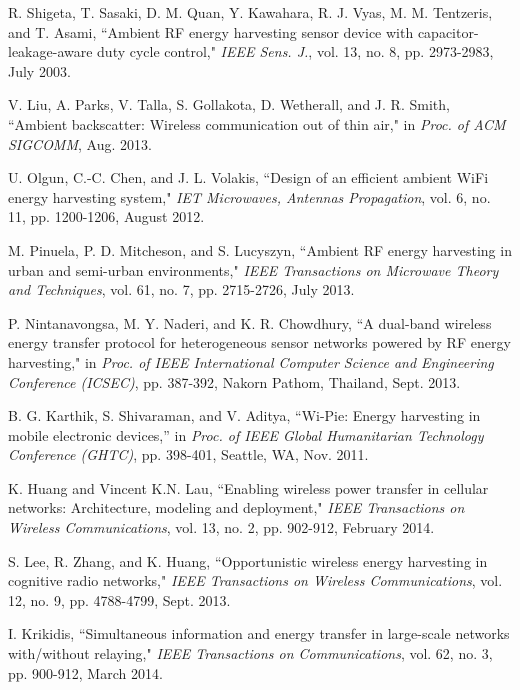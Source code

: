 \documentclass[12pt,draftclsnofoot,onecolumn]{IEEEtran}
\begin{document}
\begin{thebibliography}{99}
R. Shigeta, T. Sasaki, D. M. Quan, Y. Kawahara, R. J. Vyas, M. M. Tentzeris, and T. Asami, ``Ambient RF energy harvesting sensor device with capacitor-leakage-aware duty cycle control," \emph{IEEE Sens. J.}, vol. 13, no. 8, pp. 2973-2983, July 2003.

V. Liu, A. Parks, V. Talla, S. Gollakota, D. Wetherall, and J. R. Smith, ``Ambient backscatter: Wireless communication out of thin air," in \emph{Proc. of ACM SIGCOMM}, Aug. 2013.

 
U. Olgun, C.-C. Chen, and J. L. Volakis, ``Design of an efficient ambient WiFi energy harvesting system," \emph{IET Microwaves, Antennas  Propagation}, vol. 6, no. 11, pp. 1200-1206, August 2012. 

 
M. Pinuela, P. D. Mitcheson, and S. Lucyszyn, ``Ambient RF energy harvesting in urban and semi-urban environments," \emph{IEEE Transactions on Microwave Theory and Techniques}, vol. 61, no. 7, pp. 2715-2726, July 2013. 
 


P. Nintanavongsa, M. Y. Naderi, and K. R. Chowdhury, ``A dual-band wireless energy transfer protocol for heterogeneous sensor networks powered by RF energy harvesting," in \emph{Proc. of IEEE International Computer Science and Engineering Conference (ICSEC)}, pp. 387-392,
Nakorn Pathom, Thailand, Sept. 2013. 
 
 
B. G. Karthik, S. Shivaraman, and V. Aditya, ``Wi-Pie: Energy harvesting in mobile electronic devices,” in \emph{Proc. of IEEE Global Humanitarian Technology Conference (GHTC)}, pp. 398-401, Seattle, WA, Nov. 2011. 

K. Huang and Vincent K.N. Lau, ``Enabling wireless power transfer in cellular networks: Architecture, modeling and deployment," \emph{IEEE Transactions on Wireless Communications}, vol. 13, no. 2, pp. 902-912, February 2014. 

S. Lee, R. Zhang, and K. Huang, ``Opportunistic wireless energy harvesting in cognitive radio networks," \emph{IEEE Transactions on Wireless Communications},  vol. 12, no. 9, pp. 4788-4799,
Sept. 2013.

I. Krikidis, ``Simultaneous information and energy transfer in large-scale networks with/without relaying," \emph{IEEE Transactions on Communications}, vol. 62, no. 3, pp. 900-912, March 2014. 


\end{thebibliography}
\end{document}
